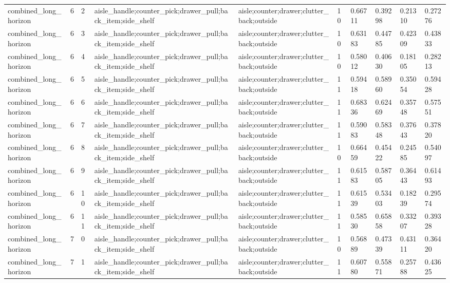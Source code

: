 \documentclass{article}
\begin{document}
\begin{table}[tbp]
{\begin{tabular}{llllllllll}
combined\_long\_horizon & 6 & 2 & aisle\_handle;counter\_pick;drawer\_pull;back\_item;side\_shelf & aisle;counter;drawer;clutter\_back;outside & 10 & 0.66711 & 0.39298 & 0.21310 & 0.27276 \\
combined\_long\_horizon & 6 & 3 & aisle\_handle;counter\_pick;drawer\_pull;back\_item;side\_shelf & aisle;counter;drawer;clutter\_back;outside & 10 & 0.63183 & 0.44785 & 0.42309 & 0.43833 \\
combined\_long\_horizon & 6 & 4 & aisle\_handle;counter\_pick;drawer\_pull;back\_item;side\_shelf & aisle;counter;drawer;clutter\_back;outside & 10 & 0.58012 & 0.40630 & 0.18105 & 0.28213 \\
combined\_long\_horizon & 6 & 5 & aisle\_handle;counter\_pick;drawer\_pull;back\_item;side\_shelf & aisle;counter;drawer;clutter\_back;outside & 11 & 0.59418 & 0.58960 & 0.35054 & 0.59428 \\
combined\_long\_horizon & 6 & 6 & aisle\_handle;counter\_pick;drawer\_pull;back\_item;side\_shelf & aisle;counter;drawer;clutter\_back;outside & 11 & 0.68336 & 0.62469 & 0.35748 & 0.57551 \\
combined\_long\_horizon & 6 & 7 & aisle\_handle;counter\_pick;drawer\_pull;back\_item;side\_shelf & aisle;counter;drawer;clutter\_back;outside & 11 & 0.59083 & 0.58348 & 0.37643 & 0.37820 \\
combined\_long\_horizon & 6 & 8 & aisle\_handle;counter\_pick;drawer\_pull;back\_item;side\_shelf & aisle;counter;drawer;clutter\_back;outside & 10 & 0.66459 & 0.45422 & 0.24585 & 0.54097 \\
combined\_long\_horizon & 6 & 9 & aisle\_handle;counter\_pick;drawer\_pull;back\_item;side\_shelf & aisle;counter;drawer;clutter\_back;outside & 11 & 0.61583 & 0.58705 & 0.36443 & 0.61493 \\
combined\_long\_horizon & 6 & 10 & aisle\_handle;counter\_pick;drawer\_pull;back\_item;side\_shelf & aisle;counter;drawer;clutter\_back;outside & 11 & 0.61539 & 0.53403 & 0.18239 & 0.29574 \\
combined\_long\_horizon & 6 & 11 & aisle\_handle;counter\_pick;drawer\_pull;back\_item;side\_shelf & aisle;counter;drawer;clutter\_back;outside & 11 & 0.58530 & 0.65858 & 0.33207 & 0.39328 \\
combined\_long\_horizon & 7 & 0 & aisle\_handle;counter\_pick;drawer\_pull;back\_item;side\_shelf & aisle;counter;drawer;clutter\_back;outside & 10 & 0.56889 & 0.47339 & 0.43111 & 0.36420 \\
combined\_long\_horizon & 7 & 1 & aisle\_handle;counter\_pick;drawer\_pull;back\_item;side\_shelf & aisle;counter;drawer;clutter\_back;outside & 11 & 0.60780 & 0.55871 & 0.25788 & 0.43625 \\

\end{tabular}}
\end{table}
\end{document}
